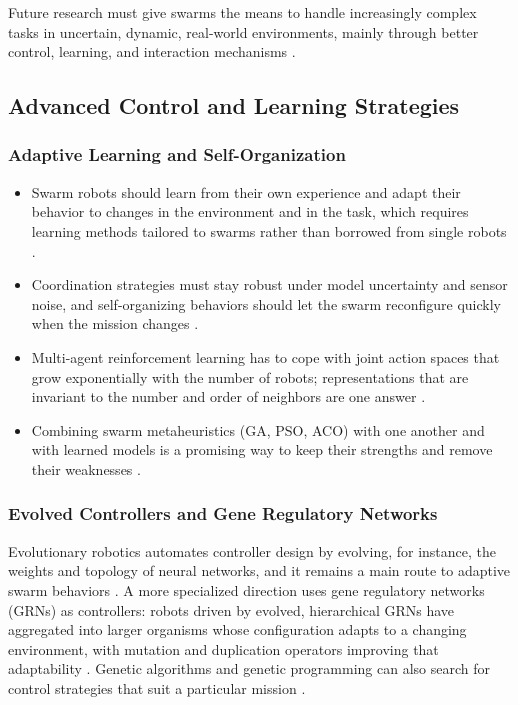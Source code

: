 Future research must give swarms the means to handle increasingly complex tasks
in uncertain, dynamic, real-world environments, mainly through better control,
learning, and interaction mechanisms
\cite{bhowmick2024bio,kegeleirs2025towards}.

\subsection{Advanced Control and Learning Strategies}

\subsubsection{Adaptive Learning and Self-Organization}

\begin{itemize}
  \item {} Swarm robots should learn from their own
        experience and adapt their behavior to changes in the environment and in
        the task, which requires learning methods tailored to swarms rather than
        borrowed from single robots \cite{bhowmick2024bio,kuckling2023recent}.
  \item {} Coordination strategies must stay
        robust under model uncertainty and sensor noise, and self-organizing
        behaviors should let the swarm reconfigure quickly when the mission
        changes \cite{kuckling2023recent}.
  \item {} Multi-agent reinforcement learning has to cope
        with joint action spaces that grow exponentially with the number of
        robots; representations that are invariant to the number and order of
        neighbors are one answer \cite{huttenrauch2019deep}.
  \item {} Combining swarm metaheuristics (GA, PSO, ACO) with
        one another and with learned models is a promising way to keep their
        strengths and remove their weaknesses \cite{seebacher2025collective}.
\end{itemize}

\subsubsection{Evolved Controllers and Gene Regulatory Networks}

Evolutionary robotics automates controller design by evolving, for instance, the
weights and topology of neural networks, and it remains a main route to adaptive
swarm behaviors \cite{kuckling2023recent}. A more specialized direction uses
gene regulatory networks (GRNs) as controllers: robots driven by evolved,
hierarchical GRNs have aggregated into larger organisms whose configuration
adapts to a changing environment, with mutation and duplication operators
improving that adaptability \cite{bhowmick2024bio}. Genetic algorithms and
genetic programming can also search for control strategies that suit a
particular mission \cite{kuckling2023recent}.


